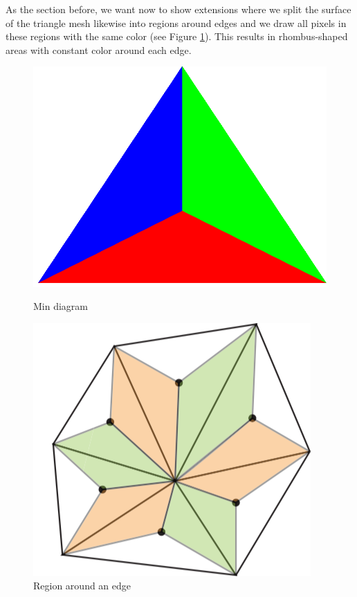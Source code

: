 \label{section:edge-area-chapter}
As the section before, we want now to show extensions where we split the surface of the triangle mesh likewise into regions around  edges and we draw all pixels in these regions with the same color (see Figure \ref{fig:edge-area}). This results in rhombus-shaped areas with constant color around each edge.

\begin{figure}[H]
    \centering
    \centering
    \includegraphics[scale=0.15]{images/min.png}
    \caption{Min diagram}\label{fig:min-diagram}
    \endminipage\hfill
    \centering
    \includegraphics[scale=0.6]{images/edge-area.png}
    \caption{Region around an edge}\label{fig:edge-area}
    \endminipage
\end{figure}

